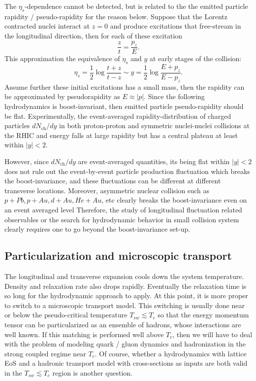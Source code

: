 The $\eta_s$-dependence cannot be detected, but is related to the the emitted particle rapidity / pseudo-rapidity for the reason below.
Suppose that the Lorentz contracted nuclei interact at $z=0$ and produce excitations that free-stream in the longitudinal direction, then for each of these excitation
\begin{equation}
  \frac{z}{t} = \frac{p_z}{E}.
\end{equation}
This approximation the equivalence of $\eta_s$ and $y$ at early stages of the collision:
\begin{equation}
  \eta_s = \frac{1}{2}\log\frac{t+z}{t-z} \sim y = \frac{1}{2}\log\frac{E+p_z}{E-p_z}.
\end{equation}
Assume further these initial excitations has a small mass, then the rapidity can be approximated by pseudorapidity as $E\approx |p|$.
Since the following hydrodynamics is boost-invariant, then emitted particle pseudo-rapidity should be flat.
Experimentally, the event-averaged rapidity-distribution of charged particles $dN_{\textrm{ch}}/dy$ in both proton-proton and symmetric nuclei-nuclei collisions at the RHIC and energy falls at large rapidity but has a central plateau at least within $|y|<2$.

However, since $dN_{\textrm{ch}}/dy$ are event-averaged quantities, its being flat within $|y|<2$ does not rule out the event-by-event particle production fluctuation which breaks the boost-invariance, and these fluctuations can be different at different transverse locations.
Moreover, asymmetric nuclear collision such as $p+Pb, p+Au, d+Au, He+Au$, etc clearly breaks the boost-invariance even on an event averaged level 
\cite{Abelev:2014mda, Aad:2014lta, Aad:2013fja, CMS:2012qk, Chatrchyan:2013nka, Khachatryan:2015waa, Khachatryan:2015oea, Khachatryan:2016ibd, Adare:2014keg, Adare:2015cpn, Adare:2018toe}
Therefore, the study of longitudinal fluctuation related observables or the search for hydrodynamic behavior in small collision system clearly requires one to go beyond the boost-invariance set-up.

\subsection{Particularization and microscopic transport}
The longitudinal and transverse expansion cools down the system temperature. 
Density and relaxation rate also drops rapidly.
Eventually the relaxation time is so long for the hydrodynamic approach to apply.
At this point, it is more proper to switch to a microscopic transport model.
This switching is usually done near or below the pseudo-critical temperature $T_{sw} \lesssim T_c$ so that the energy momentum tensor can be particularized as an ensemble of hadrons, whose interactions are well known.
If this matching is performed well above $T_c$, then we will have to deal with the problem of modeling quark / gluon dynamics and hadronization in the strong coupled regime near $T_c$.
Of course, whether a hydrodynamics with lattice EoS and a hadronic transport model with cross-sections as inputs are both valid in the $T_{sw} \lesssim T_c$ region is another question.

